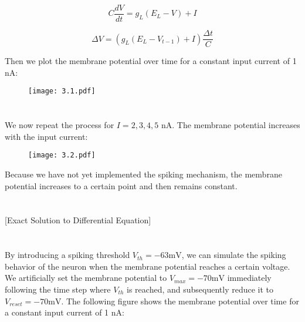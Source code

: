 \documentclass{article}
\begin{document}
\begin{equation}
    C \frac{dV}{dt} = g_L (E_L - V) + I
\end{equation}

\begin{equation}
    \Delta V = \left( g_L (E_L - V_{t-1}) + I \right) \frac{\Delta t}{C}
\end{equation}
\vspace{1px}

Then we plot the membrane potential over time for a constant input current of 1 nA:
\vspace{1px}

\begin{figure}[ht]
    \centering
    \texttt{[image: 3.1.pdf]}
\end{figure}


\section{}
We now repeat the process for $I = 2, 3, 4, 5$ nA. The membrane potential increases with the input current:

\begin{figure}[ht]
    \centering
    \texttt{[image: 3.2.pdf]}
\end{figure}

Because we have not yet implemented the spiking mechanism, the membrane potential increases to a certain point and then remains constant.

\vspace{20pt}

\section{}
[Exact Solution to Differential Equation]


\newpage
\section{}
By introducing a spiking threshold $V_{th} = -63\text{mV}$, we can simulate the spiking behavior of the neuron when the membrane potential reaches a certain voltage. We artificially set the membrane potential to $V_{max} = -70\text{mV}$ immediately following the time step where $V_{th}$ is reached, and subsequently reduce it to $V_{reset} = -70\text{mV}$. The following figure shows the membrane potential over time for a constant input current of 1 nA:
\end{document}
